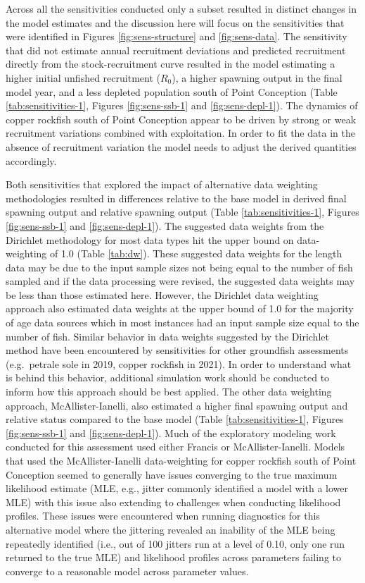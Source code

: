 \documentclass[11pt,
  english,
  letterpaper,
]{article}
\begin{document}
Across all the sensitivities conducted only a subset resulted in distinct changes in the model estimates and the discussion here will focus on the sensitivities that were identified in Figures \ref{fig:sens-structure} and \ref{fig:sens-data}. The sensitivity that did not estimate annual recruitment deviations and predicted recruitment directly from the stock-recruitment curve resulted in the model estimating a higher initial unfished recruitment (\(R_0\)), a higher spawning output in the final model year, and a less depleted population south of Point Conception (Table \ref{tab:sensitivities-1}, Figures \ref{fig:sens-ssb-1} and \ref{fig:sens-depl-1}). The dynamics of copper rockfish south of Point Conception appear to be driven by strong or weak recruitment variations combined with exploitation. In order to fit the data in the absence of recruitment variation the model needs to adjust the derived quantities accordingly.

Both sensitivities that explored the impact of alternative data weighting methodologies resulted in differences relative to the base model in derived final spawning output and relative spawning output (Table \ref{tab:sensitivities-1}, Figures \ref{fig:sens-ssb-1} and \ref{fig:sens-depl-1}). The suggested data weights from the Dirichlet methodology for most data types hit the upper bound on data-weighting of 1.0 (Table \ref{tab:dw}). These suggested data weights for the length data may be due to the input sample sizes not being equal to the number of fish sampled and if the data processing were revised, the suggested data weights may be less than those estimated here. However, the Dirichlet data weighting approach also estimated data weights at the upper bound of 1.0 for the majority of age data sources which in most instances had an input sample size equal to the number of fish. Similar behavior in data weights suggested by the Dirichlet method have been encountered by sensitivities for other groundfish assessments (e.g.~petrale sole in 2019, copper rockfish in 2021). In order to understand what is behind this behavior, additional simulation work should be conducted to inform how this approach should be best applied. The other data weighting approach, McAllister-Ianelli, also estimated a higher final spawning output and relative status compared to the base model (Table \ref{tab:sensitivities-1}, Figures \ref{fig:sens-ssb-1} and \ref{fig:sens-depl-1}). Much of the exploratory modeling work conducted for this assessment used either Francis or McAllister-Ianelli. Models that used the McAllister-Ianelli data-weighting for copper rockfish south of Point Conception seemed to generally have issues converging to the true maximum likelihood estimate (MLE, e.g., jitter commonly identified a model with a lower MLE) with this issue also extending to challenges when conducting likelihood profiles. These issues were encountered when running diagnostics for this alternative model where the jittering revealed an inability of the MLE being repeatedly identified (i.e., out of 100 jitters run at a level of 0.10, only one run returned to the true MLE) and likelihood profiles across parameters failing to converge to a reasonable model across parameter values.
\end{document}
